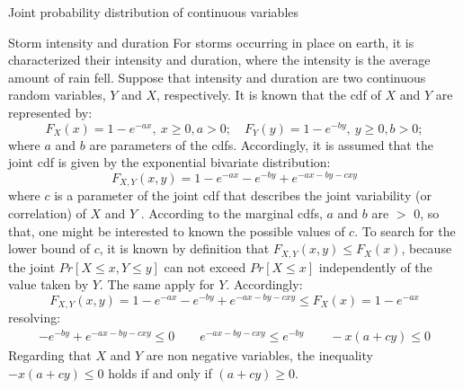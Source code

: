 \documentclass[8pt]{beamer}
\renewcommand{\emph}[1]{\textcolor{myorange}{#1}}
\begin{document}
\begin{frame}{Joint probability distribution of continuous variables}

    \begin{exampleblock}{Storm intensity and duration}
        For storms occurring in place on earth, it is characterized their \emph{intensity} and  \emph{duration}, where the intensity is the average amount of rain fell. Suppose that intensity and duration are two continuous random variables, $Y$ and $X$, respectively. It is known that the \emph{cdf} of $X$ and $Y$ are represented by:
        \[
            F_X (x) = 1 - e^{-ax},\ x \geq 0, a >0; \quad F_Y (y) = 1 - e^{-by},\ y \geq 0, b >0; 
        \]
        where $a$ and $b$ are parameters of the \emph{cdf}s. Accordingly, it is assumed that the joint \emph{cdf} is given by the exponential bivariate distribution:
        \[
            F_{X,Y} (x,y) = 1 - e^{-ax} - e^{-by}+e^{-ax-by-cxy}
        \]
        where $c$ is a parameter of the joint \emph{cdf} that describes the joint variability (or correlation) of $X$ and $Y$ . According to the marginal \emph{cdf}s, $a$ and $b$ are $>$ 0, so that, one might be interested to known the possible values of $c$. To search for the lower bound of $c$, it is known by definition that $F_{X,Y} (x,y) \leq F_X (x)$, because the joint $Pr[X\leq x, Y\leq y]$ can not exceed $Pr[X\leq x]$ independently of the value taken by $Y$. The same apply for $Y$. Accordingly:
        \vspace{-5pt}
        \[
            F_{X,Y} (x,y) = 1 - e^{-ax} - e^{-by}+e^{-ax-by-cxy} \leq F_X (x) = 1 - e^{-ax}
        \]
        resolving:
        \vspace{-5pt}
        \begin{align*}
            -e^{-by}+e^{-ax-by-cxy} \leq 0 \quad\quad e^{-ax-by-cxy} \leq e^{-by} \quad\quad -x(a+cy) \leq 0
        \end{align*}
        Regarding that $X$ and $Y$ are non negative variables, the inequality $-x(a +cy)\leq 0$ holds if and only if $(a+cy)\geq 0$. 

    \end{exampleblock}
\end{frame}
\end{document}
